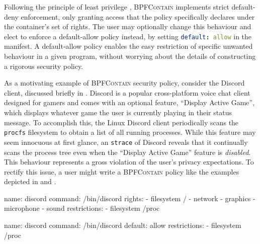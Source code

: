 \documentclass[dvipsnames, 12pt]{article}
\def\bpfcontain{\textsc{BPFContain}}
\begin{document}
Following the principle of least privilege \cite{saltzer1975_protection},
\bpfcontain{} implements strict default-deny enforcement, only granting access
that the policy specifically declares under the container's set of rights. The
user may optionally change this behaviour and elect to enforce a default-allow
policy instead, by setting \lstinline[language=yaml]{default: allow} in the
manifest. A default-allow policy enables the easy restriction of specific
unwanted behaviour in a given program, without worrying about the details of
constructing a rigorous security policy.

As a motivating example of \bpfcontain{} security policy, consider the Discord
client, discussed briefly in . Discord is a popular
cross-platform voice chat client designed for gamers and comes with an optional
feature, \enquote{Display Active Game}, which displays whatever game the user is
currently playing in their status message. To accomplish this, the Linux Discord
client periodically scans the \texttt{procfs} filesystem to obtain a list of all
running processes.  While this feature may seem innocuous at first glance, an
\texttt{strace} \cite{strace} of Discord reveals that it continually scans the
process tree even when the \enquote{Display Active Game} feature is
\textit{disabled}. This behaviour represents a gross violation of the user's
privacy expectations. To rectify this issue, a user might write a \bpfcontain{}
policy like the examples depicted in  and
.

\begin{listing}[
  language=yaml,
  caption={
    A sample manifest for Discord \cite{discord} using \bpfcontain{}'s more
    restrictive default-deny confinement. All accesses which are not listed
    under the container's rights are implictly denied. The explicit restriction
    on access to \texttt{procfs} prevents Discord from scanning the process
    tree, regardless of its rights.
  },
  label={lst:discord_a},
  gobble=2]
  name: discord
  command: /bin/discord
  rights:
    - filesystem /
    - network
    - graphics
    - microphone
    - sound
  restrictions:
    - filesystem /proc
\end{listing}

\begin{listing}[
  language=yaml,
  caption={
    A sample manifest for Discord \cite{discord} using \bpfcontain{}'s optional
    default-allow confinement.  This permits a much simpler policy that directly
    targets Discord's \texttt{procfs} scanning behaviour.
  },
  label={lst:discord_b},
  gobble=2]
  name: discord
  command: /bin/discord
  default: allow
  restrictions:
    - filesystem /proc
\end{listing}
\end{document}
